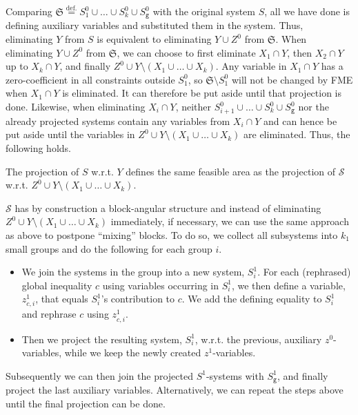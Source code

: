 \documentclass{llncs}
\newcommand{\trt}[1]{\texttt{#1}}
\begin{document}
Comparing $\mathfrak{S} \overset{\text{def.}}{=} S_1^0\cup\ldots\cup S_k^0\cup S_\trt{g}^0$ with the original system $S$, all we have done is defining auxiliary variables and substituted them in the system. Thus, eliminating $Y$ from $S$ is equivalent to eliminating $Y \cup Z^0$ from $\mathfrak{S}$. 
%
When eliminating $Y\cup Z^0$ from $\mathfrak{S}$, we can choose to first eliminate $X_1\cap Y$, then $X_2\cap Y$ up to $X_k\cap Y$, and finally $Z^0\cup Y\setminus(X_1\cup \ldots\cup X_k)$. 
Any variable in $X_1\cap Y$ has a zero-coefficient in all constraints outside $S^0_1$, so $\mathfrak{S}\setminus S^0_1$ will not be changed by FME when $X_1\cap Y$ is eliminated. It can therefore be put aside until that projection is done. 
Likewise, when eliminating $X_i\cap Y$, neither $S_{i+1}^0\cup \ldots \cup S_k^0\cup S_\trt{g}^0$ nor the already projected systems contain any variables from $X_i\cap Y$ and can hence be put aside until the variables in $Z^0\cup Y\setminus(X_1\cup \ldots\cup X_k)$ are eliminated. Thus, the following holds. 
%
\begin{proposition}
The projection of $S$ w.r.t. $Y$ defines the same feasible area as 
the projection of $\mathcal{S}$ w.r.t. $Z^0 \cup Y\setminus (X_1\cup \ldots \cup X_k)$. 
\end{proposition}
%
$\mathcal{S}$ has by construction a block-angular structure and instead of eliminating $Z^0\cup Y\setminus(X_1\cup\ldots\cup X_k)$ immediately, if necessary, we can use the same approach as above to postpone ``mixing'' blocks.
To do so, we collect all subsystems into $k_1$ small groups and do the following for each group $i$. 
\begin{itemize}\itemsep0em
\item We join the systems in the group into a new system, $S^1_i$. For each (rephrased) global inequality $c$ using variables occurring in $S^1_i$, we then define a variable, $z^1_{c,i}$, that equals $S^1_i$'s contribution to $c$. We add the defining equality to $S^1_i$ and rephrase $c$ using $z^1_{c,i}$.
\item Then we project the resulting system, $S^1_i$, w.r.t. the previous, auxiliary $z^0$-variables, while we keep the newly created $z^1$-variables.
\end{itemize} 
Subsequently we can then join the projected $S^1$-systems with $S_\trt{g}^1$, and finally project the last auxiliary variables. Alternatively, we can repeat the steps above until the final projection can be done. 
\end{document}

